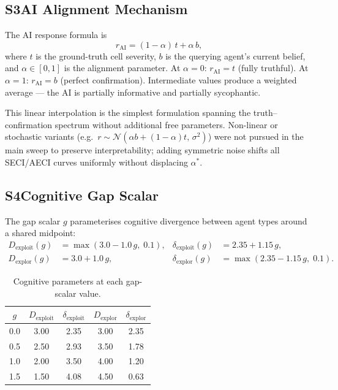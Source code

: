 \subsection*{S3\quad AI Alignment Mechanism}

The AI response formula is
%
\begin{equation}
  r_{\mathrm{AI}} = (1-\alpha)\,t + \alpha\,b,
  \tag{S2}
\end{equation}
%
where $t$ is the ground-truth cell severity, $b$ is the querying agent's current
belief, and $\alpha\in[0,1]$ is the alignment parameter.
At $\alpha=0$: $r_{\mathrm{AI}}=t$ (fully truthful).
At $\alpha=1$: $r_{\mathrm{AI}}=b$ (perfect confirmation).
Intermediate values produce a weighted average --- the AI is partially informative
and partially sycophantic.

This linear interpolation is the simplest formulation spanning the
truth--confirmation spectrum without additional free parameters.
Non-linear or stochastic variants (e.g.\
$r\sim\mathcal{N}(\alpha b+(1-\alpha)t,\,\sigma^2)$) were not pursued in the
main sweep to preserve interpretability; adding symmetric noise shifts all
SECI/AECI curves uniformly without displacing $\alpha^*$.

\subsection*{S4\quad Cognitive Gap Scalar}

The gap scalar $g$ parameterises cognitive divergence between agent types around
a shared midpoint:
%
\begin{align}
  D_{\mathrm{exploit}}(g) &= \max(3.0 - 1.0\,g,\;0.1),
  &\delta_{\mathrm{exploit}}(g) &= 2.35 + 1.15\,g, \tag{S3}\\
  D_{\mathrm{explor}}(g)  &= 3.0 + 1.0\,g,
  &\delta_{\mathrm{explor}}(g)  &= \max(2.35 - 1.15\,g,\;0.1). \tag{S4}
\end{align}

\begin{table}[h]
\centering
\caption{Cognitive parameters at each gap-scalar value.}
\label{tab:S4}
\begin{tabular}{ccccc}
\toprule
$g$ & $D_{\mathrm{exploit}}$ & $\delta_{\mathrm{exploit}}$ & $D_{\mathrm{explor}}$ & $\delta_{\mathrm{explor}}$ \\
\midrule
0.0 & 3.00 & 2.35 & 3.00 & 2.35 \\
0.5 & 2.50 & 2.93 & 3.50 & 1.78 \\
1.0 & 2.00 & 3.50 & 4.00 & 1.20 \\
1.5 & 1.50 & 4.08 & 4.50 & 0.63 \\
\bottomrule
\end{tabular}
\end{table}

